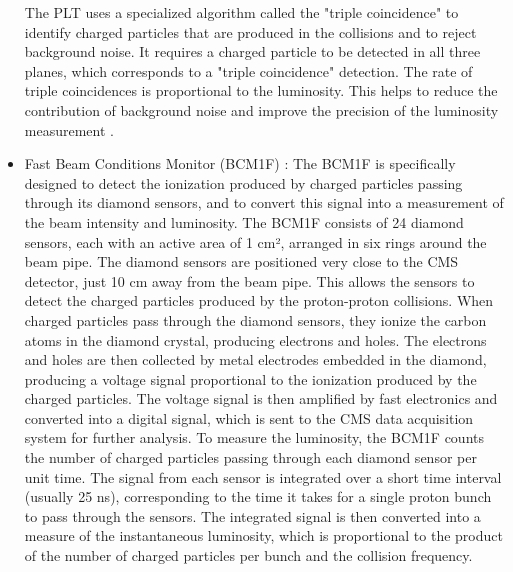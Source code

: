 \begin{itemize}
  The PLT uses a specialized algorithm called the "triple coincidence" to identify charged particles that are produced in the collisions and to reject background noise. It requires a charged particle to be detected in all three planes, which corresponds to a "triple coincidence" detection. The rate of triple coincidences is proportional to the luminosity. This helps to reduce the contribution of background noise and improve the precision of the luminosity measurement \cite{Lujan:2017kvh}.

\item Fast Beam Conditions Monitor (BCM1F) : The BCM1F is specifically designed to detect the ionization produced by charged particles passing through its diamond sensors, and to convert this signal into a measurement of the beam intensity and luminosity. The BCM1F consists of 24 diamond sensors, each with an active area of 1 cm², arranged in six rings around the beam pipe. The diamond sensors are positioned very close to the CMS detector, just 10 cm away from the beam pipe. This allows the sensors to detect the charged particles produced by the proton-proton collisions. When charged particles pass through the diamond sensors, they ionize the carbon atoms in the diamond crystal, producing electrons and holes. The electrons and holes are then collected by metal electrodes embedded in the diamond, producing a voltage signal proportional to the ionization produced by the charged particles. The voltage signal is then amplified by fast electronics and converted into a digital signal, which is sent to the CMS data acquisition system for further analysis. To measure the luminosity, the BCM1F counts the number of charged particles passing through each diamond sensor per unit time. The signal from each sensor is integrated over a short time interval (usually 25 ns), corresponding to the time it takes for a single proton bunch to pass through the sensors. The integrated signal is then converted into a measure of the instantaneous luminosity, which is proportional to the product of the number of charged particles per bunch and the collision frequency.



\end{itemize}
